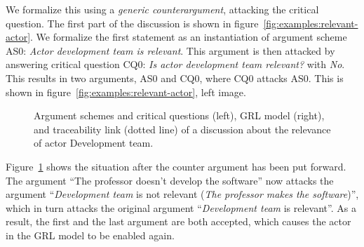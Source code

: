 We formalize this using a \emph{generic counterargument}, attacking the critical question. The first part of the discussion is shown in figure~\ref{fig:examples:relevant-actor}. We formalize the first statement as an instantiation of argument scheme AS0: \emph{Actor development team is relevant}. This argument is then attacked by answering critical question CQ0: \emph{Is actor development team relevant?} with \emph{No}. This results in two arguments, AS0 and CQ0, where CQ0 attacks AS0. This is shown in figure~\ref{fig:examples:relevant-actor}, left image.

\begin{figure}[ht!]
\centering
\caption{Argument schemes and critical questions (left), GRL model (right), and traceability link (dotted line) of a discussion about the relevance of actor Development team.}
\label{fig:examples:relevant-actor2}
\end{figure}

Figure~\ref{fig:examples:relevant-actor2} shows the situation after the counter argument has been put forward. The argument ``The professor doesn't develop the software'' now attacks the argument ``\emph{Development team} is not relevant (\emph{The professor makes the software})'', which in turn attacks the original argument ``\emph{Development team} is relevant''. As a result, the first and the last argument are both accepted, which causes the actor in the GRL model to be enabled again.